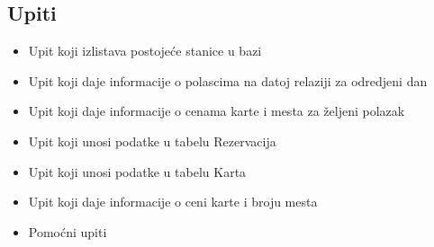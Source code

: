 \documentclass[12pt]{article}
\begin{document}
\subsection{Upiti}
\begin{itemize}
	\item Upit koji izlistava postoje\'ce stanice u bazi
	\item Upit koji daje informacije o polascima na datoj relaziji za odredjeni dan
	\item Upit koji daje informacije o cenama karte i mesta za \v zeljeni polazak
 	\item Upit koji unosi podatke u tabelu Rezervacija
	\item Upit koji unosi podatke u tabelu Karta
	\item Upit koji daje informacije o ceni karte i broju mesta
	\item Pomo\'cni upiti
\end{itemize}
\end{document}
